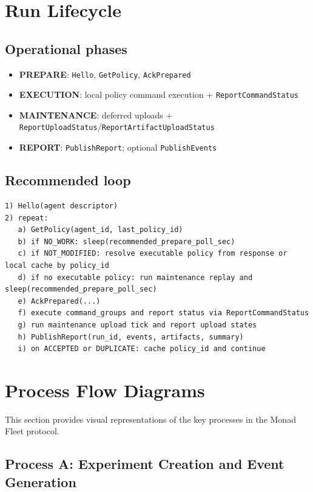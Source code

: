\documentclass[11pt,a4paper]{article}
\begin{document}
\section{Run Lifecycle}
\subsection{Operational phases}
\begin{itemize}
  \item \textbf{PREPARE}: \texttt{Hello}, \texttt{GetPolicy}, \texttt{AckPrepared}
  \item \textbf{EXECUTION}: local policy command execution + \texttt{ReportCommandStatus}
  \item \textbf{MAINTENANCE}: deferred uploads + \texttt{ReportUploadStatus}/\texttt{ReportArtifactUploadStatus}
  \item \textbf{REPORT}: \texttt{PublishReport}; optional \texttt{PublishEvents}
\end{itemize}

\subsection{Recommended loop}
\begin{verbatim}
1) Hello(agent descriptor)
2) repeat:
   a) GetPolicy(agent_id, last_policy_id)
   b) if NO_WORK: sleep(recommended_prepare_poll_sec)
   c) if NOT_MODIFIED: resolve executable policy from response or local cache by policy_id
   d) if no executable policy: run maintenance replay and sleep(recommended_prepare_poll_sec)
   e) AckPrepared(...)
   f) execute command_groups and report status via ReportCommandStatus
   g) run maintenance upload tick and report upload states
   h) PublishReport(run_id, events, artifacts, summary)
   i) on ACCEPTED or DUPLICATE: cache policy_id and continue
\end{verbatim}

\section{Process Flow Diagrams}

This section provides visual representations of the key processes in the Monad Fleet protocol.

\subsection{Process A: Experiment Creation and Event Generation}
\end{document}
